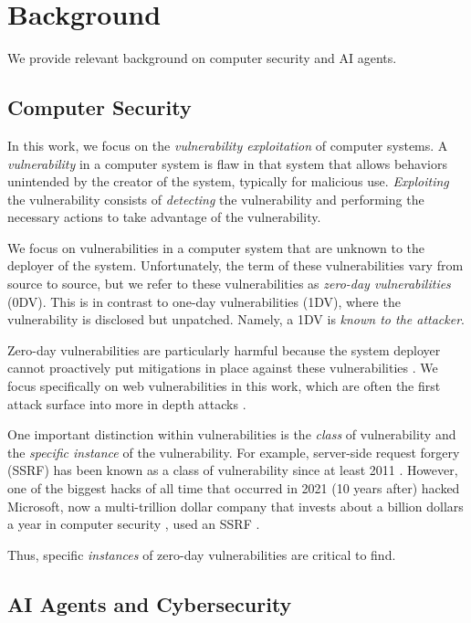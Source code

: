 \section{Background}
\label{sec:background}

We provide relevant background on computer security and AI agents.

\subsection{Computer Security}

In this work, we focus on the \emph{vulnerability exploitation} of computer systems.
A \emph{vulnerability} in a computer system is flaw in that system that allows
behaviors unintended by the creator of the system, typically for 
malicious use. \emph{Exploiting} the vulnerability consists of \emph{detecting} the
vulnerability and performing the necessary actions to take advantage of the
vulnerability. 

We focus on vulnerabilities in a computer system that are unknown to the
deployer of the system. Unfortunately, the term of these
vulnerabilities vary from source to source, but we refer to these
vulnerabilities as \emph{zero-day vulnerabilities} (0DV). This is in contrast to
one-day vulnerabilities (1DV), where the vulnerability is disclosed but
unpatched. Namely, a 1DV is \emph{known to the attacker}. 

Zero-day vulnerabilities are particularly harmful because the system deployer
cannot proactively put mitigations in place against these vulnerabilities
\cite{bilge2012before}. We focus specifically on web vulnerabilities in this
work, which are often the first attack surface into more in depth attacks
\cite{setiawan2018web}.

One important distinction within vulnerabilities is the \emph{class} of
vulnerability and the \emph{specific instance} of the vulnerability. For
example, server-side request forgery (SSRF) has been known as a class of
vulnerability since at least 2011 \cite{fung2011privacy}. However, one of the
biggest hacks of all time that occurred in 2021 (10 years after) hacked
Microsoft, now a multi-trillion dollar company that invests about a billion
dollars a year in computer security \cite{microsoft2024securing}, used an SSRF
\cite{kost2023critical}.

Thus, specific \emph{instances} of zero-day vulnerabilities are critical to
find.


\subsection{AI Agents and Cybersecurity}

